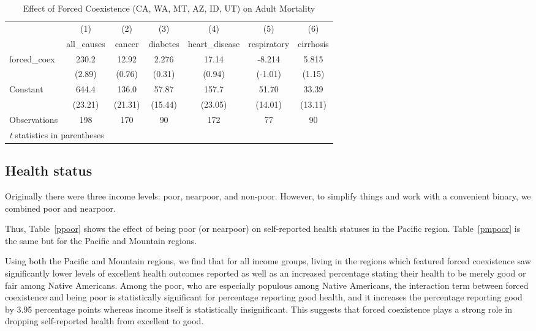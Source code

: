 \documentclass[12pt]{article}
\begin{document}
\begin{table}[htbp]\centering \caption{Effect of Forced Coexistence (CA, WA, MT, AZ, ID, UT) on Adult Mortality\label{adult4}} \begin{tabular}{l*{6}{c}} \toprule
                    &\multicolumn{1}{c}{(1)}&\multicolumn{1}{c}{(2)}&\multicolumn{1}{c}{(3)}&\multicolumn{1}{c}{(4)}&\multicolumn{1}{c}{(5)}&\multicolumn{1}{c}{(6)}\\
                    &\multicolumn{1}{c}{all\_causes}&\multicolumn{1}{c}{cancer}&\multicolumn{1}{c}{diabetes}&\multicolumn{1}{c}{heart\_disease}&\multicolumn{1}{c}{respiratory}&\multicolumn{1}{c}{cirrhosis}\\
\midrule
forced\_coex         &       230.2&       12.92&       2.276&       17.14&      -8.214&       5.815\\
                    &      (2.89)&      (0.76)&      (0.31)&      (0.94)&     (-1.01)&      (1.15)\\
\addlinespace
Constant            &       644.4&       136.0&       57.87&       157.7&       51.70&       33.39\\
                    &     (23.21)&     (21.31)&     (15.44)&     (23.05)&     (14.01)&     (13.11)\\
\midrule
Observations        &         198&         170&          90&         172&          77&          90\\
\bottomrule
\multicolumn{7}{l}{\footnotesize \textit{t} statistics in parentheses}\\
\end{tabular}
\end{table}











\subsection{Health status}
Originally there were three income levels: poor, nearpoor, and non-poor. However, to simplify things and work with a convenient binary, we combined poor and nearpoor.

Thus, Table~\ref{ppoor} shows the effect of being poor (or nearpoor) on self-reported health statuses in the Pacific region. Table~\ref{pmpoor} is the same but for the Pacific and Mountain regions.

Using both the Pacific and Mountain regions, we find that for all income groups, living in the regions which featured forced coexistence saw significantly lower levels of excellent health outcomes reported as well as an increased percentage stating their health to be merely good or fair among Native Americans.  Among the poor, who are especially populous among Native Americans, the interaction term between forced coexistence and being poor is statistically significant for percentage reporting good health, and it increases the percentage reporting good by 3.95 percentage points whereas income itself is statistically insignificant.  This suggests that forced coexistence plays a strong role in dropping self-reported health from excellent to good.
\end{document}
